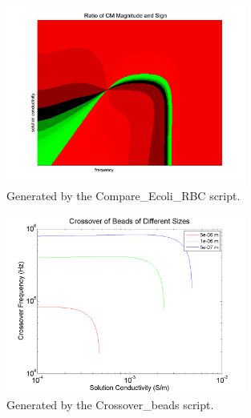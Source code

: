 \documentclass[12pt]{article}
\begin{document}
\begin{figure}[here]
\centering
\includegraphics[width=0.7\textwidth]{Figures/CMcompare_sign_mag}
\caption{Generated by the Compare\_Ecoli\_RBC script.}
\end{figure}

\begin{figure}[here]
\centering
\includegraphics[width=0.7\textwidth]{Figures/Crossover_size}
\caption{Generated by the Crossover\_beads script.}
\end{figure}

% 
\end{document}
